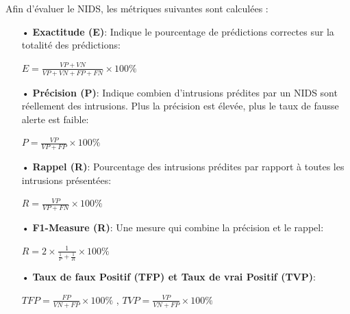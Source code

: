 Afin d'évaluer le NIDS, les métriques suivantes sont calculées :\\
\begin{itemize}
	\item[•] \textbf{Exactitude (E)}: Indique le pourcentage de prédictions correctes sur la totalité des prédictions:
	\begin{large}
		\begin{center}
			$ E = \frac{VP + VN}{ VP + VN + FP + FN} \times 100\% $
		\end{center}
	\end{large}
	
	\hfill
	
	\item[•] \textbf{Précision (P)}: Indique combien d’intrusions prédites par un NIDS sont réellement des intrusions. Plus la précision est élevée, plus le taux de fausse alerte est faible:
	\begin{large}
		\begin{center}
			$ P = \frac{VP}{ VP + FP} \times 100\%$
		\end{center}
	\end{large}
	
	\hfill
	
	\item[•] \textbf{Rappel (R)}: Pourcentage des intrusions prédites par rapport à toutes les intrusions présentées:
	\begin{large}
		\begin{center}
			$ R = \frac{VP}{ VP + FN} \times 100\%$
		\end{center}
	\end{large}
	
	\hfill
	
	\item[•] \textbf{F1-Measure (R)}: Une mesure qui combine la précision et le rappel:\\
	\begin{large}
		\begin{center}
			$ R = 2 \times \frac{1}{ \frac{1}{P} + \frac{1}{R}} \times 100\%$
		\end{center}
	\end{large}
	
	\hfill
	
	\item[•] \textbf{Taux de faux Positif (TFP) et Taux de vrai Positif (TVP)}:\\
	\begin{large}
		\begin{center}
			$ TFP = \frac{FP}{ VN + FP} \times 100\%$ , $ TVP = \frac{VP}{ VN + FP} \times 100\%$ 
		\end{center}
	\end{large}
\end{itemize}

